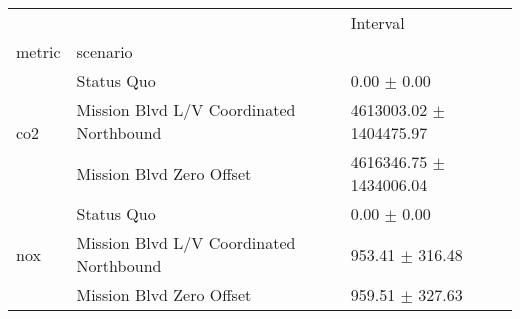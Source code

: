 \begin{tabular}{lll}
\toprule
 &  & Interval \\
metric & scenario &  \\
\midrule
\multirow[t]{3}{*}{co2} & Status Quo & 0.00 $\pm$ 0.00 \\
 & Mission Blvd L/V Coordinated Northbound & 4613003.02 $\pm$ 1404475.97 \\
 & Mission Blvd Zero Offset & 4616346.75 $\pm$ 1434006.04 \\
\multirow[t]{3}{*}{nox} & Status Quo & 0.00 $\pm$ 0.00 \\
 & Mission Blvd L/V Coordinated Northbound & 953.41 $\pm$ 316.48 \\
 & Mission Blvd Zero Offset & 959.51 $\pm$ 327.63 \\
\bottomrule
\end{tabular}
